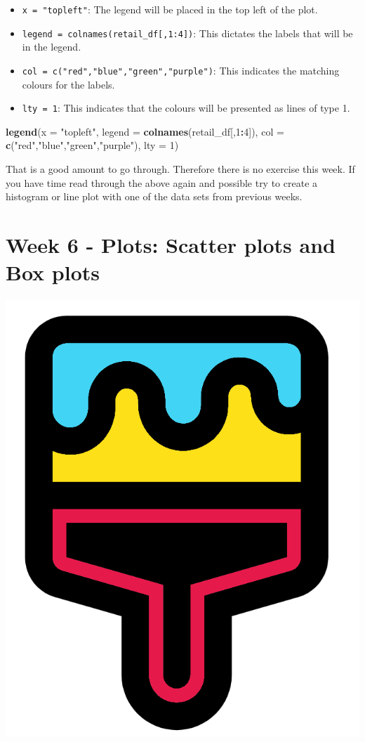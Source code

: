\documentclass[]{book}
\newenvironment{Shaded}{\begin{snugshade}}{\end{snugshade}}
\newcommand{\KeywordTok}[1]{\textcolor[rgb]{0.13,0.29,0.53}{\textbf{#1}}}
\newcommand{\DataTypeTok}[1]{\textcolor[rgb]{0.13,0.29,0.53}{#1}}
\newcommand{\DecValTok}[1]{\textcolor[rgb]{0.00,0.00,0.81}{#1}}
\newcommand{\StringTok}[1]{\textcolor[rgb]{0.31,0.60,0.02}{#1}}
\newcommand{\OperatorTok}[1]{\textcolor[rgb]{0.81,0.36,0.00}{\textbf{#1}}}
\newcommand{\NormalTok}[1]{#1}
\providecommand{\tightlist}{%
  \setlength{\itemsep}{0pt}\setlength{\parskip}{0pt}}
\begin{document}
\begin{itemize}
\tightlist
\item
  \texttt{x\ =\ "topleft"}: The legend will be placed in the top left of
  the plot.
\item
  \texttt{legend\ =\ colnames(retail\_df{[},1:4{]})}: This dictates the
  labels that will be in the legend.
\item
  \texttt{col\ =\ c("red","blue","green","purple")}: This indicates the
  matching colours for the labels.
\item
  \texttt{lty\ =\ 1}: This indicates that the colours will be presented
  as lines of type 1.
\end{itemize}

\begin{Shaded}
\begin{Highlighting}[]
\KeywordTok{legend}\NormalTok{(}\DataTypeTok{x =} \StringTok{"topleft"}\NormalTok{,}
       \DataTypeTok{legend =} \KeywordTok{colnames}\NormalTok{(retail_df[,}\DecValTok{1}\OperatorTok{:}\DecValTok{4}\NormalTok{]),}
       \DataTypeTok{col =} \KeywordTok{c}\NormalTok{(}\StringTok{"red"}\NormalTok{,}\StringTok{"blue"}\NormalTok{,}\StringTok{"green"}\NormalTok{,}\StringTok{"purple"}\NormalTok{),}
       \DataTypeTok{lty =} \DecValTok{1}\NormalTok{)}
\end{Highlighting}
\end{Shaded}

That is a good amount to go through. Therefore there is no exercise this
week. If you have time read through the above again and possible try to
create a histogram or line plot with one of the data sets from previous
weeks.

\chapter{Week 6 - Plots: Scatter plots and Box
plots}\label{week-6---plots-scatter-plots-and-box-plots}

\begin{center}\includegraphics[width=0.2\linewidth]{figures/large_brush} \end{center}
\end{document}
